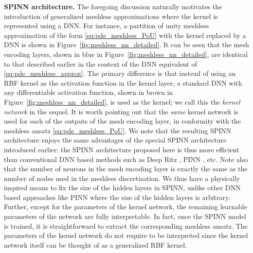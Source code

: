 \documentclass[12pt]{article}
\begin{document}
\textbf{SPINN architecture.} The foregoing discussion naturally motivates the introduction of generalized meshless approximations where the kernel is represented using a DNN. For instance, a partition of unity meshless approximation of the form \eqref{eq:pde_meshless_PoU} with the kernel replaced by a DNN is shown in Figure~\ref{fig:meshless_nn_detailed}. It can be seen that the mesh encoding layers, shown in blue in Figure~\ref{fig:meshless_nn_detailed}, are identical to that described earlier in the context of the DNN equivalent of \eqref{eq:pde_meshless_approx}. The primary difference is that instead of using an RBF kernel as the activation function in the kernel layer, a standard DNN with any differentiable activation function, shown in brown in Figure~\ref{fig:meshless_nn_detailed}, is used as the kernel; we call this the \emph{kernel network} in the sequel. It is worth pointing out that the \emph{same} kernel network is used for each of the outputs of the mesh encoding layer, in conformity with the meshless ansatz \eqref{eq:pde_meshless_PoU}. We note that the resulting SPINN architecture enjoys the same advantages of the special SPINN architecture introduced earlier: the SPINN architecture proposed here is thus more efficient than conventional DNN based methods such as Deep Ritz \cite{EYu2018}, PINN \cite{RPK2019}, etc. Note also that the number of neurons in the mesh encoding layer is exactly the same as the number of nodes used in the meshless discretization. We thus have a physically inspired means to fix the size of the hidden layers in SPINN, unlike other DNN based approaches like PINN where the size of the hidden layers is arbitrary.  Further, except for the parameters of the kernel network, the remaining learnable parameters of the network are fully interpretable. In fact, once the SPINN model is trained, it is straightforward to extract the corresponding meshless ansatz. The parameters of the kernel network do not require to be interpreted since the kernel network itself can be thought of as a generalized RBF kernel.
\end{document}

